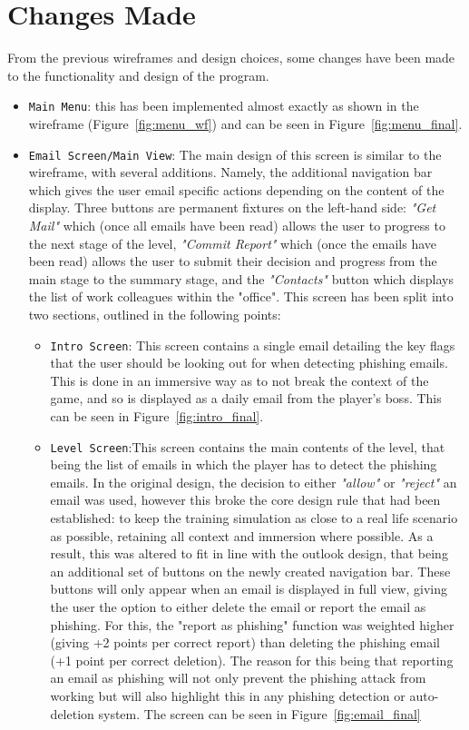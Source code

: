 \documentclass{l4proj}
\begin{document}
\section{Changes Made}
From the previous wireframes and design choices, some changes have been made to the functionality and design of the program.

\begin{itemize}
  \item \verb|Main Menu|: this has been implemented almost exactly as shown in the wireframe (Figure~\ref{fig:menu_wf}) and can be seen in Figure~\ref{fig:menu_final}.
  \item \verb|Email Screen/Main View|: The main design of this screen is similar to the wireframe, with several additions. Namely, the additional navigation bar which gives the user email specific actions depending on the content of the display. Three buttons are permanent fixtures on the left-hand side: \textit{"Get Mail"} which (once all emails have been read) allows the user to progress to the next stage of the level, \textit{"Commit Report"} which (once the emails have been read) allows the user to submit their decision and progress from the main stage to the summary stage, and the \textit{"Contacts"} button which displays the list of work colleagues within the "office". This screen has been split into two sections, outlined in the following points:
    \begin{itemize}
        \item \verb|Intro Screen|: This screen contains a single email detailing the key flags that the user should be looking out for when detecting phishing emails. This is done in an immersive way as to not break the context of the game, and so is displayed as a daily email from the player's boss. This can be seen in Figure~\ref{fig:intro_final}.
        \item \verb|Level Screen|:This screen contains the main contents of the level, that being the list of emails in which the player has to detect the phishing emails. In the original design, the decision to either \textit{"allow"} or \textit{"reject"} an email was used, however this broke the core design rule that had been established: to keep the training simulation as close to a real life scenario as possible, retaining all context and immersion where possible. As a result, this was altered to fit in line with the outlook design, that being an additional set of buttons on the newly created navigation bar. These buttons will only appear when an email is displayed in full view, giving the user the option to either delete the email or report the email as phishing. For this, the "report as phishing" function was weighted higher (giving +2 points per correct report) than deleting the phishing email (+1 point per correct deletion). The reason for this being that reporting an email as phishing will not only prevent the phishing attack from working but will also highlight this in any phishing detection or auto-deletion system. The screen can be seen in Figure~\ref{fig:email_final}

\end{itemize}
\end{itemize}
\end{document}
